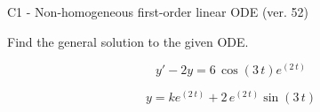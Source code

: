 \begin{exercise}
  \begin{exerciseTitle}C1 - Non-homogeneous first-order linear ODE (ver. 52)\end{exerciseTitle}
  \begin{exerciseStatement}
    
Find the general solution to the given ODE.

    
\[y'-2y= 6 \, \cos\left(3 \, t\right) e^{\left(2 \, t\right)}\]

  \end{exerciseStatement}
  \begin{exerciseAnswer}
    
\[y= k e^{\left(2 \, t\right)} + 2 \, e^{\left(2 \, t\right)} \sin\left(3 \, t\right)\]

  \end{exerciseAnswer}
\end{exercise}
